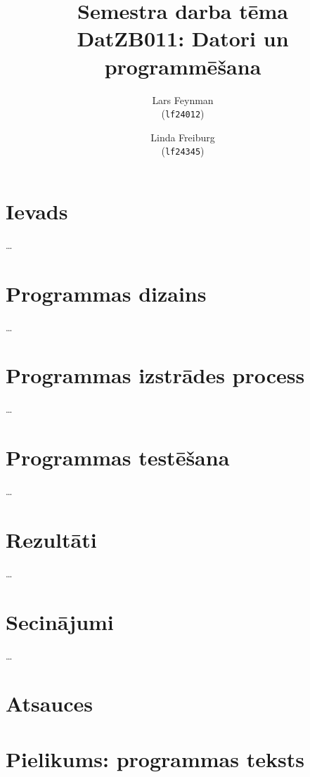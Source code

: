 \documentclass[a4paper,10pt]{article}
\title{
    Semestra darba tēma\\[-0.2\baselineskip]
    {\large DatZB011: Datori un programmēšana}
}
\author{
  Lars Feynman\\
  (\texttt{lf24012})
  \and
  Linda Freiburg\\
  (\texttt{lf24345})
}
\begin{document}
\maketitle

\section{Ievads}
\dots

\section{Programmas dizains}

\dots

\section{Programmas izstrādes process}
\dots

\section{Programmas testēšana}
\dots

\section{Rezultāti}
\dots

\section{Secinājumi}
\dots

\section{Atsauces}


\pagebreak
\section{Pielikums: programmas teksts}

\end{document}
